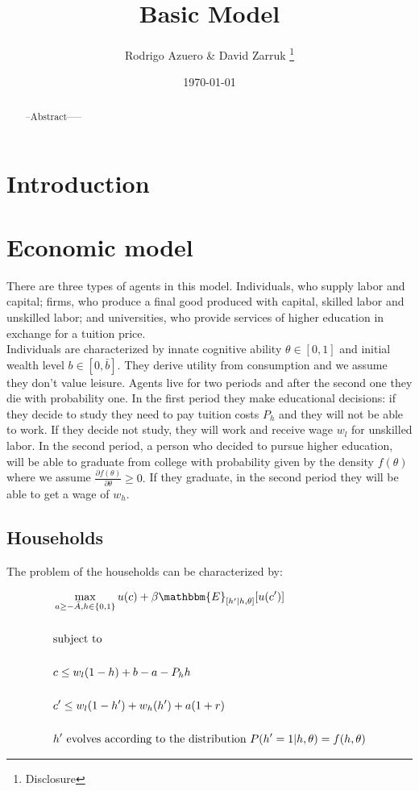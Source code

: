 \documentclass[11pt]{article}
\title{\vspace{-3cm}Basic Model}
\author{Rodrigo Azuero \& David Zarruk \thanks{Disclosure }}
\date{\today}
\begin{document}
\maketitle

\begin{abstract}
--Abstract-----
\end{abstract}

\section{Introduction}

\section{Economic model}
There are three types of agents in this model. Individuals, who supply labor and capital; firms, who produce a final good produced with capital, skilled labor and unskilled labor; and universities, who provide services of higher education in exchange for a tuition price. 
\\[0.2in]
Individuals are characterized by innate cognitive ability $\theta \in [0,1]$ and initial wealth level $b \in [0,\bar b]$. They derive utility from consumption and we assume they don't value leisure. Agents live for two periods and after the second one they die with probability one. In the first period they make educational decisions: if they decide to study they need to pay tuition costs $P_h$ and they will not be able to work. If they decide not study, they will work and receive wage $w_l$ for unskilled labor. In the second period, a person who decided to pursue higher education, will be able to graduate from college with probability given by the density $f(\theta)$ where we assume $\frac{\partial f(\theta)}{\partial \theta}\geq 0.$ If they graduate, in the second period they will be able to get a wage of $w_h$. 
\subsection{Households}
The problem of the households can be characterized by:

\begin{align}
& \max_{a\geq -\bar A, h \in \{0,1\}}  u(c)+\beta \mathbbm{E}_{\left[h'|h,\theta\right]}[u(c')]
\\[0.2in]
& \text{subject to }\nonumber
\\[0.2in]
& c \leq  w_l(1-h)+b -a-P_hh
\\[0.2in]
& c'\leq w_l(1-h')+w_h(h')+a(1+r) 
\\[0.2in]
& h' \text{ evolves according to the distribution } P(h'=1|h,\theta)=  f(h,\theta)
\end{align}
\end{document}

